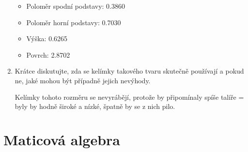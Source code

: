 \begin{enumerate}
    \begin{itemize}
        \item Poloměr spodní podstavy: 0.3860
        \item Poloměr horní podstavy: 0.7030
        \item Výška: 0.6265
        \item Povrch: 2.8702
    \end{itemize}
    
    
    
    \item Krátce diskutujte, zda se kelímky takového tvaru skutečně používají a pokud ne, jaké mohou být případně jejich nevýhody.
    
    Kelímky tohoto rozměru se nevyrábějí, protože by připomínaly spíše talíře = byly by hodně široké a nízké, špatně by se z nich pilo.
\end{enumerate}

\newpage

\section{Maticová algebra}

